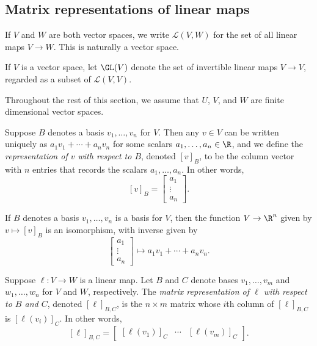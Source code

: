 \subsection{Matrix representations of linear maps} \label{matrix-representations}

\begin{definition}
	If $V$ and $W$ are both vector spaces, we write $\mathscr{L}(V, W)$ for the set of all linear maps $V \to W$. This is naturally a vector space. 
\end{definition}

\begin{definition}
	If $V$ is a vector space, let $\GL(V)$ denote the set of invertible linear maps $V \to V$, regarded as a subset of $\mathscr{L}(V,V)$. 
\end{definition}

Throughout the rest of this section, we assume that $U$, $V$, and $W$ are finite dimensional vector spaces. 

\begin{definition}
	Suppose $B$ denotes a basis $v_1, \dotsc, v_n$ for $V$. Then any $v \in V$ can be written uniquely as $a_1v_1 + \dotsb + a_n v_n$ for some scalars $a_1, \dotsc, a_n \in \R$, and we define the \emph{representation of $v$ with respect to $B$}, denoted $[v]_B$, to be the column vector with $n$ entries that records the scalars $a_1, \dotsc, a_n$. In other words,
	\[ [v]_B = \begin{bmatrix} a_1 \\ \vdots \\ a_n \end{bmatrix}. \]
\end{definition}

\begin{lemma}
	If $B$ denotes a basis $v_1, \dotsc, v_n$ is a basis for $V$, then the function $V \to \R^n$ given by $v \mapsto [v]_B$ is an isomorphism, with inverse given by
	\[ \begin{bmatrix} a_1 \\ \vdots \\ a_n \end{bmatrix} \mapsto a_1 v_1 + \dotsb + a_n v_n. \]
\end{lemma}

\begin{definition} \label{matrix-representation-linear}
	Suppose $\ell : V \to W$ is a linear map. Let $B$ and $C$ denote bases $v_1, \dotsc, v_m$ and $w_1, \dotsc, w_n$ for $V$ and $W$, respectively. The \emph{matrix representation of $\ell$ with respect to $B$ and $C$}, denoted $[\ell]_{B,C}$, is the $n \times m$ matrix whose $i$th column of $[\ell]_{B,C}$ is $[\ell(v_i)]_C$. In other words,
	\[ [\ell]_{B,C} = \begin{bmatrix} [\ell(v_1)]_C & \dotsb & [\ell(v_m)]_C \end{bmatrix}. \]
\end{definition}

